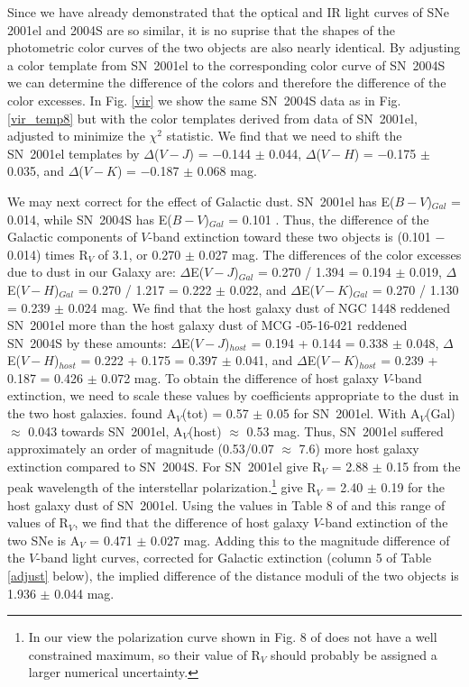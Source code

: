 \documentclass[12pt,preprint,psfig,epsf]{aastex}
\begin{document}
Since we have already demonstrated that the optical and IR light curves of
SNe 2001el and 2004S are so similar, it is no suprise that the shapes of the
photometric color curves of the two objects are also nearly identical.  
By adjusting a color template from SN~2001el to the corresponding color
curve of SN~2004S we can determine the difference of the colors
and therefore the difference of the color excesses.  In Fig. \ref{vir}
we show the same SN~2004S data as in Fig. \ref{vir_temp8} but with the color
templates derived from data of SN~2001el, adjusted to minimize the $\chi^2$
statistic.  We find that we need to shift the SN~2001el templates by
$\Delta$($V-J$) = $-$0.144 $\pm$ 0.044, 
$\Delta$($V-H$) = $-$0.175 $\pm$ 0.035, and 
$\Delta$($V-K$) = $-$0.187 $\pm$ 0.068 mag. 

We may next correct for the effect of Galactic dust.  SN~2001el has
E($B-V$)$_{Gal}$ = 0.014, while SN~2004S has E($B-V$)$_{Gal}$ = 0.101
\citep{Sch_etal98}.  Thus, the difference of the Galactic components of $V$-band
extinction toward these two objects is (0.101 $-$ 0.014) times R$_V$ of 3.1, or
0.270 $\pm$ 0.027 mag.  The differences of the color excesses due to dust in our 
Galaxy are:
$\Delta$E($V-J$)$_{Gal}$ = 0.270 / 1.394 = 0.194 $\pm$ 0.019,
$\Delta$E($V-H$)$_{Gal}$ = 0.270 / 1.217 = 0.222 $\pm$ 0.022, and
$\Delta$E($V-K$)$_{Gal}$ = 0.270 / 1.130 = 0.239 $\pm$ 0.024 mag.
We find that the
host galaxy dust of NGC 1448 reddened SN~2001el more than the host
galaxy dust of MCG -05-16-021 reddened SN~2004S by these amounts:
$\Delta$E($V-J$)$_{host}$ = 0.194 + 0.144 = 0.338 $\pm$ 0.048, 
$\Delta$E($V-H$)$_{host}$ = 0.222 + 0.175 = 0.397 $\pm$ 0.041, and 
$\Delta$E($V-K$)$_{host}$ = 0.239 + 0.187 = 0.426 $\pm$ 0.072 mag.  
To obtain the difference
of host galaxy $V$-band extinction, we need to scale these values
by coefficients appropriate to the dust in the two host galaxies.
\citet{Kri_etal03} found A$_V$(tot) = 0.57 $\pm$ 0.05 for SN~2001el.
With A$_V$(Gal) $\approx$ 0.043 towards SN~2001el, A$_V$(host) $\approx$
0.53 mag.  Thus, SN~2001el suffered approximately
an order of magnitude (0.53/0.07 $\approx$ 7.6) more host galaxy extinction 
compared to SN~2004S. For SN~2001el \citet{Wan_etal03b} give R$_V$ = 2.88 $\pm$ 
0.15 from the peak wavelength of the interstellar polarization.\footnote[19]{In
our view the polarization curve shown in Fig. 8 of \citet{Wan_etal03b} 
does not have a well constrained maximum, so their value of R$_V$ should probably  
be assigned a larger numerical uncertainty.}  \citet{Jha_etal06b}
give R$_V$ = 2.40 $\pm$ 0.19 for the host galaxy dust of SN~2001el.
Using the values in Table 8 of \citet{Kri_etal06} and this range of
values of R$_V$, we find that the difference of host galaxy $V$-band
extinction of the two SNe is A$_V$ = 0.471 $\pm$ 0.027 mag.  Adding
this to the magnitude difference of the $V$-band light curves, corrected
for Galactic extinction (column 5 of Table \ref{adjust} below), the
implied difference of the distance moduli of the two objects is
1.936 $\pm$ 0.044 mag.
\end{document}
